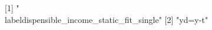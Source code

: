 [1] "\\label{dispensible_income_static_fit_single}"
[2] "{yd}={y}-{t}"                                 
